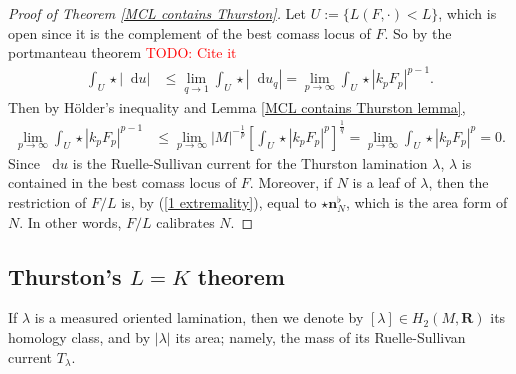 \documentclass[reqno,11pt]{amsart}
\newcommand{\RR}{\mathbf{R}}
\newcommand*\dif{\mathop{}\!\mathrm{d}}
\newcommand{\normal}{\mathbf n}
\theoremstyle{definition}
\numberwithin{equation}{section}
\newcommand\todo[1]{\textcolor{red}{TODO: #1}}
\begin{document}
\begin{proof}[Proof of Theorem \ref{MCL contains Thurston}]
Let $U := \{L(F, \cdot) < L\}$, which is open since it is the complement of the best comass locus of $F$.
So by the portmanteau theorem \todo{Cite it}
\begin{align*}
\int_U \star |\dif u|
&\leq \lim_{q \to 1} \int_U \star |\dif u_q|
= \lim_{p \to \infty} \int_U \star |k_p F_p|^{p - 1}.
\end{align*}
Then by H\"older's inequality and Lemma \ref{MCL contains Thurston lemma},
\begin{align*}
\lim_{p \to \infty} \int_U \star |k_p F_p|^{p - 1}
&\leq \lim_{p \to \infty} |M|^{-\frac{1}{p}} \left[\int_U \star |k_p F_p|^p\right]^{\frac{1}{q}} 
= \lim_{p \to \infty} \int_U \star |k_p F_p|^p = 0.
\end{align*}
Since $\dif u$ is the Ruelle-Sullivan current for the Thurston lamination $\lambda$, $\lambda$ is contained in the best comass locus of $F$. 
Moreover, if $N$ is a leaf of $\lambda$, then the restriction of $F/L$ is, by (\ref{1 extremality}), equal to $\star \normal_N^\flat$, which is the area form of $N$.
In other words, $F/L$ calibrates $N$.
\end{proof}



\subsection{Thurston's \texorpdfstring{$L = K$}{L equals K} theorem}
If $\lambda$ is a measured oriented lamination, then we denote by $[\lambda] \in H_2(M, \RR)$ its homology class, and by $|\lambda|$ its area; namely, the mass of its Ruelle-Sullivan current $T_\lambda$.
\end{document}
